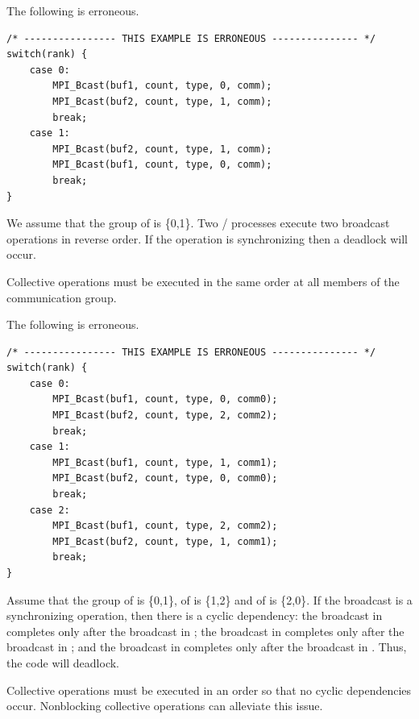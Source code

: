 \begin{example}
\label{coll-excorr1}
%
%
The following is erroneous.

\begin{lstlisting}[language={[MPI]C}]
/* ---------------- THIS EXAMPLE IS ERRONEOUS --------------- */
switch(rank) {
    case 0:
        MPI_Bcast(buf1, count, type, 0, comm);
        MPI_Bcast(buf2, count, type, 1, comm);
        break;
    case 1:
        MPI_Bcast(buf2, count, type, 1, comm);
        MPI_Bcast(buf1, count, type, 0, comm);
        break;
}
\end{lstlisting}

We assume that the group of  is \{0,1\}.
Two \MPI/ processes execute two broadcast operations in reverse order.  If
the operation is synchronizing then a deadlock will occur.

Collective
operations must be executed in the same order at all members of the
communication group.
\end{example}


\begin{example}
\label{coll-excorr2}
%
%
The following is erroneous.

\begin{lstlisting}[language={[MPI]C}]
/* ---------------- THIS EXAMPLE IS ERRONEOUS --------------- */
switch(rank) {
    case 0:
        MPI_Bcast(buf1, count, type, 0, comm0);
        MPI_Bcast(buf2, count, type, 2, comm2);
        break;
    case 1:
        MPI_Bcast(buf1, count, type, 1, comm1);
        MPI_Bcast(buf2, count, type, 0, comm0);
        break;
    case 2:
        MPI_Bcast(buf1, count, type, 2, comm2);
        MPI_Bcast(buf2, count, type, 1, comm1);
        break;
}
\end{lstlisting}

Assume that the group of
 is \{0,1\}, of  is \{1,2\} and of 
is \{2,0\}.  If the broadcast is a synchronizing operation, then there
is a cyclic dependency: the broadcast in  completes only
after the broadcast in ; the broadcast in 
completes only after the broadcast in ; and the broadcast
in  completes only after the broadcast in .
Thus, the code will deadlock.

Collective operations must be executed in an order so that
no cyclic dependencies occur. Nonblocking collective operations can
alleviate this issue.
\end{example}



